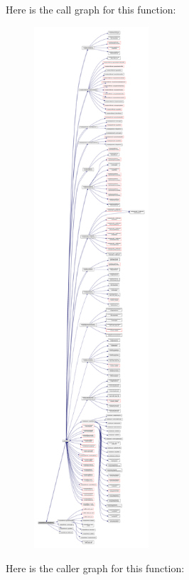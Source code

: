 Here is the call graph for this function\+:\nopagebreak
\begin{figure}[H]
\begin{center}
\leavevmode
\includegraphics[height=550pt]{namespacemodulecfformat_a66da5c204d14d5f914e0226b731d5b00_cgraph}
\end{center}
\end{figure}
Here is the caller graph for this function\+:\nopagebreak
